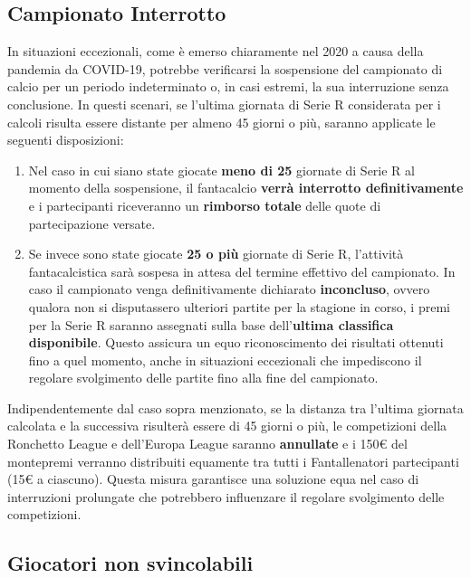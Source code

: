 \documentclass[12pt]{article}
\begin{document}
\subsection{Campionato Interrotto}
In situazioni eccezionali, come è emerso chiaramente nel 2020 a causa della pandemia da COVID-19, potrebbe verificarsi la sospensione del campionato di calcio per un periodo indeterminato o, in casi estremi, la sua interruzione senza conclusione. In questi scenari, se l'ultima giornata di Serie R considerata per i calcoli risulta essere distante per almeno 45 giorni o più, saranno applicate le seguenti disposizioni:

\begin{enumerate}
    \item Nel caso in cui siano state giocate \textbf{meno di 25} giornate di Serie R al momento della sospensione, il fantacalcio \textbf{verrà interrotto definitivamente} e i partecipanti riceveranno un \textbf{rimborso totale} delle quote di partecipazione versate.
    
    \item Se invece sono state giocate \textbf{25 o più} giornate di Serie R, l'attività fantacalcistica sarà sospesa in attesa del termine effettivo del campionato. In caso il campionato venga definitivamente dichiarato \textbf{inconcluso}, ovvero qualora non si disputassero ulteriori partite per la stagione in corso, i premi per la Serie R saranno assegnati sulla base dell'\textbf{ultima classifica disponibile}. Questo assicura un equo riconoscimento dei risultati ottenuti fino a quel momento, anche in situazioni eccezionali che impediscono il regolare svolgimento delle partite fino alla fine del campionato.
    
\end{enumerate}

Indipendentemente dal caso sopra menzionato, se la distanza tra l'ultima giornata calcolata e la successiva risulterà essere di 45 giorni o più, le competizioni della Ronchetto League e dell'Europa League saranno \textbf{annullate} e i 150€ del montepremi verranno distribuiti equamente tra tutti i Fantallenatori partecipanti (15€ a ciascuno). Questa misura garantisce una soluzione equa nel caso di interruzioni prolungate che potrebbero influenzare il regolare svolgimento delle competizioni.

\subsection{Giocatori non svincolabili}
\end{document}
